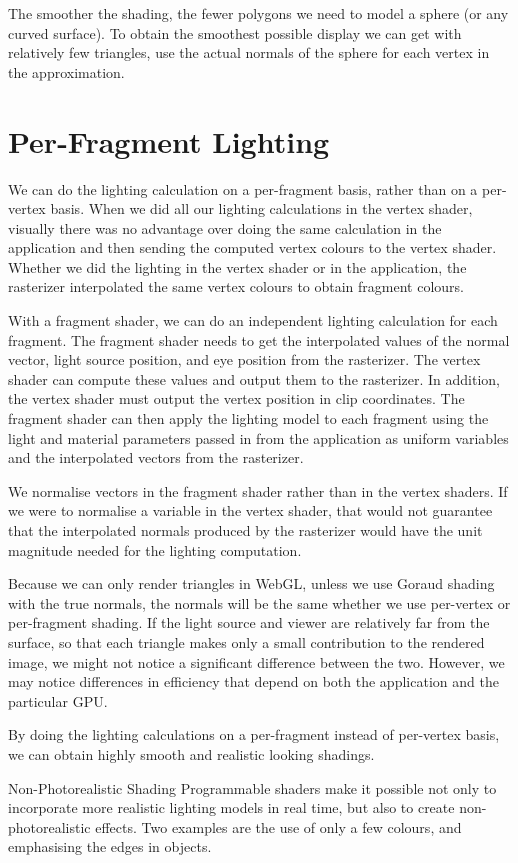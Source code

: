 \documentclass[../COS3712_Notes.tex]{subfiles}
\begin{document}
      The smoother the shading, the fewer polygons we need to model a sphere (or any curved surface).
      To obtain the smoothest possible display we can get with relatively few triangles,
      use the actual normals of the sphere for each vertex in the approximation.

    \section{Per-Fragment Lighting}
      We can do the lighting calculation on a per-fragment basis, rather than on a per-vertex basis.
      When we did all our lighting calculations in the vertex shader, visually there was no
      advantage over doing the same calculation in the application and then sending the computed
      vertex colours to the vertex shader.
      Whether we did the lighting in the vertex shader or in the application, the rasterizer
      interpolated the same vertex colours to obtain fragment colours.

      With a fragment shader, we can do an independent lighting calculation for each fragment.
      The fragment shader needs to get the interpolated values of the normal vector,
      light source position, and eye position from the rasterizer.
      The vertex shader can compute these values and output them to the rasterizer.
      In addition, the vertex shader must output the vertex position in clip coordinates.
      The fragment shader can then apply the lighting model to each fragment
      using the light and material parameters passed in from the application as uniform variables
      and the interpolated vectors from the rasterizer.

      We normalise vectors in the fragment shader rather than in the vertex shaders.
      If we were to normalise a variable in the vertex shader, that would not guarantee
      that the interpolated normals produced by the rasterizer would have the unit magnitude
      needed for the lighting computation.

      Because we can only render triangles in WebGL, unless we use Goraud shading with the true
      normals, the normals will be the same whether we use per-vertex or per-fragment shading.
      If the light source and viewer are relatively far from the surface,
      so that each triangle makes only a small contribution to the rendered image,
      we might not notice a significant difference between the two.
      However, we may notice differences in efficiency that depend on both the application
      and the particular GPU.

      By doing the lighting calculations on a per-fragment instead of per-vertex basis,
      we can obtain highly smooth and realistic looking shadings.

      \begin{sidenote}[float]{Non-Photorealistic Shading}
        Programmable shaders make it possible not only to incorporate more realistic lighting
        models in real time, but also to create non-photorealistic effects.
        Two examples are the use of only a few colours, and emphasising the edges in objects.
      \end{sidenote}
\end{document}

